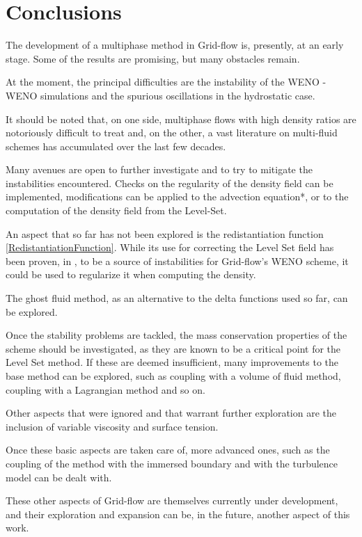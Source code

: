 \documentclass[11pt, a4paper, oneside, openany]{book}
\begin{document}
\chapter{Conclusions}\label{Chapter_Conclusions_and_Future_Work}
The development of a multiphase method in Grid-flow is, presently, at an early stage. Some of the results are promising, but many obstacles remain.\par
At the moment, the principal difficulties are the instability of the WENO - WENO simulations and the spurious oscillations in the hydrostatic case.\par
It should be noted that, on one side, multiphase flows with high density ratios are notoriously difficult to treat and, on the other, a vast literature on multi-fluid schemes has accumulated over the last few decades.\par 
Many avenues are open to further investigate and to try to mitigate the instabilities encountered. Checks on the regularity of the density field can be implemented, modifications can be applied to the advection equation*, or to the computation of the density field from the Level-Set.\par
An aspect that so far has not been explored is the redistantiation function \eqref{RedistantiationFunction}. While its use for correcting the Level Set field has been proven, in \cite{Bardin2015}, to be a source of instabilities for Grid-flow's WENO scheme, it could be used to regularize it when computing the density.\par
The ghost fluid method, as an alternative to the delta functions used so far, can be explored.\par
Once the stability problems are tackled, the mass conservation properties of the scheme should be investigated, as they are known to be a critical point for the Level Set method. If these are deemed insufficient, many improvements to the base method can be explored, such as coupling with a volume of fluid method, coupling with a Lagrangian method and so on.\par
Other aspects that were ignored and that warrant further exploration are the inclusion of variable viscosity and surface tension.\par
Once these basic aspects are taken care of, more advanced ones, such as the coupling of the method with the immersed boundary and with the turbulence model can be dealt with.\par
These other aspects of Grid-flow are themselves currently under development, and their exploration and expansion can be, in the future, another aspect of this work.

\backmatter
{}

\nocite{*}

\end{document}
